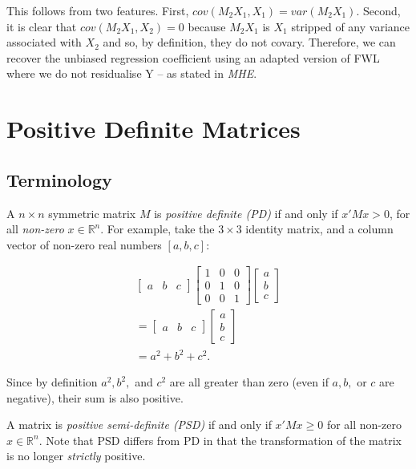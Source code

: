 \documentclass[
]{book}
\begin{document}
This follows from two features. First, \(cov(M_2X_1,X_1) = var(M_2X_1)\). Second, it is clear that \(cov(M_2X_1, X_2) =0\) because \(M_2X_1\) is \(X_1\) stripped of any variance associated with \(X_2\) and so, by definition, they do not covary. Therefore, we can recover the unbiased regression coefficient using an adapted version of FWL where we do not residualise Y -- as stated in \emph{MHE}.

\hypertarget{pd}{%
\chapter{Positive Definite Matrices}\label{pd}}

\hypertarget{pd_terms}{%
\section{Terminology}\label{pd_terms}}

A \(n \times n\) symmetric matrix \(M\) is \emph{positive definite (PD)} if and only if \(x'Mx > 0\), for all \emph{non-zero} \(x \in \mathbb{R}^n\). For example, take the \(3 \times 3\) identity matrix, and a column vector of non-zero real numbers \([a,b,c]\):

\[
\begin{aligned}
\begin{bmatrix}
a & b & c
\end{bmatrix}
\begin{bmatrix}
1 & 0 & 0\\
0 & 1 & 0 \\
0 & 0 & 1
\end{bmatrix}
\begin{bmatrix}
a \\
b \\
c
\end{bmatrix} \\
= \begin{bmatrix}
a & b & c
\end{bmatrix}
\begin{bmatrix}
a \\
b \\
c
\end{bmatrix} \\
= a^2 + b^2 + c^2.
\end{aligned}
\]

Since by definition \(a^2, b^2,\) and \(c^2\) are all greater than zero (even if \(a,b,\) or \(c\) are negative), their sum is also positive.

A matrix is \emph{positive semi-definite (PSD)} if and only if \(x'Mx \geq 0\) for all non-zero \(x \in \mathbb{R}^n\). Note that PSD differs from PD in that the transformation of the matrix is no longer \emph{strictly} positive.
\end{document}

